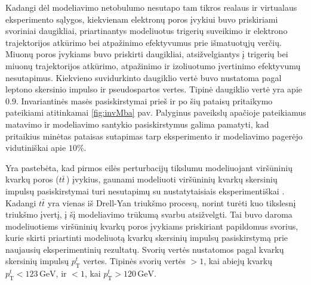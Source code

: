 \documentclass[a4paper, 12pt, twoside]{article}
\begin{document}
Kadangi dėl modeliavimo netobulumo nesutapo tam tikros realaus ir virtualaus eksperimento sąlygos,
kiekvienam elektronų poros įvykiui buvo priskiriami svoriniai daugikliai, priartinantys modeliuotus trigerių
suveikimo ir elektrono trajektorijos atkūrimo bei atpažinimo efektyvumus prie išmatuotųjų verčių.
Miuonų poros įvykiams buvo priskirti daugikliai, atsižvelgiantys į trigerių bei miuonų trajektorijos atkūrimo,
atpažinimo ir izoliuotumo įvertinimo efektyvumų nesutapimus.
Kiekvieno suvidurkinto daugiklio vertė buvo nustatoma pagal leptono skersinio impulso ir pseudospartos vertes.
Tipinė daugiklio vertė yra apie $0.9$.
Invariantinės masės pasiskirstymai prieš ir po šių pataisų pritaikymo pateikiami atitinkamai \ref{fig:invMba} pav.
Palyginus paveikslų apačioje pateikiamus matavimo ir modeliavimo santykio pasiskirstymus galima pamatyti, kad
pritaikius minėtas pataisas sutapimas tarp eksperimento ir modeliavimo pagerėjo vidutiniškai apie $10\%$.

Yra pastebėta, kad pirmos eilės perturbacijų tikslumu modeliuojant viršūninių kvarkų poros ($t\bar{t}\,$)
įvykius, gaunami modeliuoti viršūninių kvarkų skersinių impulsų pasiskirstymai turi nesutapimų su nustatytaisiais
eksperimentiškai \cite{ttbarPT}.
Kadangi $t\bar{t}$ yra vienas iš Drell-Yan triukšmo procesų, norint turėti kuo tikslesnį triukšmo įvertį, į šį
modeliavimo trūkumą svarbu atsižvelgti.
Tai buvo daroma modeliuotiems viršūninių kvarkų poros įvykiams priskiriant papildomus svorius, kurie skirti
priartinti modeliuotą kvarkų skersinių impulsų pasiskirstymą prie naujausių eksperimentinių rezultatų.
Svorių vertės nustatomos pagal kvarkų skersinių impulsų $p_{\mathrm{T}}^{t}$ vertes.
Tipinės svorių vertės $>1$, kai abiejų kvarkų $p_{\mathrm{T}}^{t}<123 \, \mathrm{GeV}$, ir $<1$,
kai $p_{\mathrm{T}}^{t}>120 \, \mathrm{GeV}$.
\end{document}
